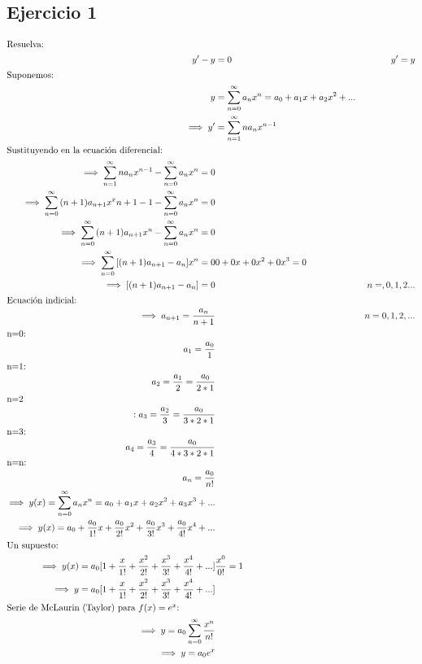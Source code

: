 \documentclass[11pt,fleqn]{book} %
\begin{document}
\subsection{Ejercicio 1}
\begin{align}
    \intertext{Resuelva:}
    y'-y&=0&y'=y\\
    \intertext{Suponemos:}
    y&=\sum_{n=0}^{\infty}{a_n x^n}=a_0+a_1 x +a_2 x^2 +...\\
    \implies y' &= \sum_{n=1}^\infty na_n x^{n-1}\\
    \intertext{Sustituyendo en la ecuación diferencial:}
    \implies \sum_{n=1}^\infty na_n x^{n-1} - \sum_{n=0}^{\infty}{a_n x^n}=0\\
    \implies \sum_{n=0}^{\infty}{(n+1)a_{n+1}x^x{n+1-1}}- \sum_{n=0}^{\infty}{a_n x^n}=0\\
    \implies \sum_{n=0}^{\infty}{(n+1)a_{n+1}x^n}-\sum_{n=0}^{\infty}{a_n x^n}=0\\
    \implies \sum_{n=0}^{\infty}{[(n+1)a_{n+1}-a_n]}x^n=0 & 0+0x+0x^2+0x^3 =0 \\ 
    \implies [(n+1)a_{n+1}-a_n]=0 && n=,0,1,2...\\
    \intertext{Ecuación indicial:}
    \implies a_{n+1}=\frac{a_n}{n+1}&&n=0,1,2,...\\
    \intertext{n=0:}
    a_1 = \frac{a_0}{1}\\
    \intertext{n=1:}
    a_2 = \frac{a_1}{2}=\frac{a_0}{2*1}\\
    \intertext{n=2}: 
    a_3=\frac{a_2}{3}=\frac{a_0}{3*2*1}\\
    \intertext{n=3:}
    a_4 =\frac{a_3}{4}=\frac{a_0}{4*3*2*1}\\
    \intertext{n=n:}
    a_n = \frac{a_0}{n!}\\
    \implies y(x)=\sum_{n=0}^{\infty}{a_n x^n}=a_0+a_1 x +a_2 x^2 +a_3 x^3+...\\
    \implies y(x)= a_0 +\frac{a_0}{1!}x + \frac{a_0}{2!}x^2+\frac{a_0}{3!}x^3 + \frac{a_0}{4!}x^4+...\\
    \intertext{Un supuesto:}
    \implies y(x)= a_0 [1+\frac{x}{1!}+\frac{x^2}{2!}+\frac{x^3}{3!}+\frac{x^4}{4!}+...]&\frac{x^0}{0!}=1\\
    \implies y = a_0 [1+\frac{x}{1!}+\frac{x^2}{2!}+\frac{x^3}{3!}+\frac{x^4}{4!}+...]\\
    \intertext{Serie de McLaurin (Taylor) para $f(x)=e^x$:}
    \implies y= a_0 \sum_{n=0}^{\infty}{\frac{x^n}{n!}} \\
    \implies y= a_0 e^x 
\end{align}
\end{document}
